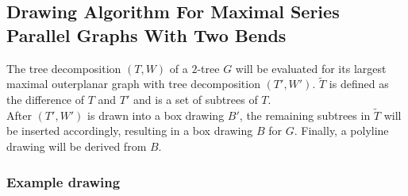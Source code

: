 
\subsection{Drawing Algorithm For Maximal Series Parallel Graphs With Two Bends}

The tree decomposition $(T,W)$ of a $2$-tree $G$ will be evaluated for its largest maximal outerplanar graph with tree decomposition $(T',W')$. $\tilde{T}$ is defined as the difference of $T$ and $T'$ and is a set of subtrees of $T$.\\
After $(T',W')$ is drawn into a box drawing $B'$, the remaining subtrees in $\tilde{T}$ will be inserted accordingly, resulting in a box drawing $B$ for $G$. Finally, a polyline drawing will be derived from $B$.



\subsubsection{Example drawing}
